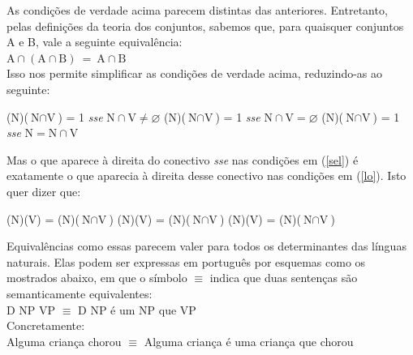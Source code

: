 \n As condições de verdade acima parecem distintas das anteriores.
Entretanto, pelas definições da teoria dos conjuntos, sabemos que, para quaisquer conjuntos A e B, vale a seguinte equivalência:\\

\n $\text{A}\cap (\text{A}\cap\text{B})\ =\
\text{A}\cap\text{B}$\\

\n Isso nos permite simplificar as condições de verdade acima,
reduzindo-as ao seguinte:


\begin{exe}
    \ex\label{sel}
    \begin{xlist}
        \ex  {}(N)($\text{N}\cap\text{V}$) = 1 \textit{sse}
            $\text{N}\cap\text{V}\neq\varnothing$\label{sela}
        \ex  {}(N)($\text{N}\cap\text{V}$) = 1 \textit{sse}
            $\text{N}\cap \text{V}=\varnothing$\label{selz}
        \ex  {}(N)($\text{N}\cap\text{V}$) = 1 \textit{sse}
            $\text{N}=\text{N}\cap\text{V}$\label{selc}
    \end{xlist}
\end{exe}

\n Mas o que aparece à direita do conectivo \textit{sse} nas
condições em (\ref{sel}) é exatamente o que aparecia à direita desse
conectivo nas condições em (\ref{lo}). Isto quer dizer que:


\begin{exe}
    \ex\label{ul}
    \begin{xlist}
        \ex  \den{algum}(N)(V) = \den{algum}(N)($\text{N}\cap\text{V}$)\label{ula}
        \ex  {}(N)(V) = (N)($\text{N}\cap\text{V}$)\label{ulz}
        \ex  \den{todo}(N)(V) = \den{nenhum}(N)($\text{N}\cap\text{V}$)\label{ulc}
    \end{xlist}
\end{exe}

\n Equivalências como essas parecem valer
para todos os determinantes das línguas naturais. Elas podem ser expressas em português por esquemas como os mostrados abaixo, em que o símbolo $\equiv$ indica que duas sentenças são semanticamente equivalentes:\\

\n D NP VP $\equiv$ D NP é um NP que VP \\

\n Concretamente:\\

\n Alguma criança chorou $\equiv$ Alguma criança é uma criança que chorou\\

